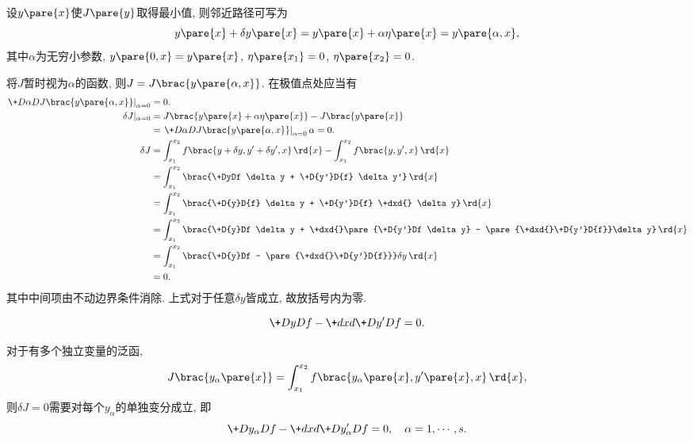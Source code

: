 \documentclass{ctexart}
\begin{document}
设$y\pare{x}$使$J\pare{y}$取得最小值, 则邻近路径可写为
\[ y\pare{x} + \delta y\pare{x} = y\pare{x} + \alpha \eta\pare{x} = y\pare{\alpha, x}, \]
其中$\alpha$为无穷小参数, $y\pare{0,x} = y\pare{x}$, $\eta\pare{x_1} = 0$, $\eta\pare{x_2} = 0$.
\par
将$J$暂时视为$\alpha$的函数, 则$J = J\brac{y\pare{\alpha,x}}$. 在极值点处应当有
\begin{align*}
    \left.\+D{\alpha}D{J\brac{y\pare{\alpha,x}}}\right\vert_{\alpha = 0} &= 0. \\
    \delta J\vert_{\alpha = 0} &= J\brac{y\pare{x} + \alpha \eta\pare{x}} - J\brac{y\pare{x}} \\
    &= \left.\+D{\alpha}D{J\brac{y\pare{\alpha,x}}}\right\vert_{\alpha = 0}\alpha = 0. \\
    \delta J &= \int_{x_1}^{x_2} f\brac{y+\delta y, y'+\delta y', x}\,\rd{x} - \int_{x_1}^{x_2} f\brac{y,y',x}\,\rd{x} \\
    &= \int_{x_1}^{x_2} \brac{\+DyDf \delta y + \+D{y'}D{f} \delta y'}\,\rd{x} \\
    &= \int_{x_1}^{x_2} \brac{\+D{y}D{f} \delta y + \+D{y'}D{f} \+dxd{} \delta y}\,\rd{x} \\
    &= \int_{x_1}^{x_2} \brac{\+D{y}Df \delta y + \+dxd{}\pare{\+D{y'}Df \delta y} - \pare{\+dxd{}\+D{y'}D{f}}\delta y}\,\rd{x} \\
    &= \int_{x_1}^{x_2} \brac{\+D{y}Df  - \pare{\+dxd{}\+D{y'}D{f}}}\delta y\,\rd{x} \\
    &= 0.
\end{align*}
其中中间项由不动边界条件消除. 上式对于任意$\delta y$皆成立, 故放括号内为零.
\begin{theorem}[Euler方程]
    \[ \+D{y}D{f} - \+dxd{}\+D{y'}D{f} = 0. \]
\end{theorem}
对于有多个独立变量的泛函,
\[ J\brac{y_\alpha\pare{x}} = \int_{x_1}^{x_2} f\brac{y_\alpha\pare{x},y'\pare{x},x}\,\rd{x}, \]
则$\delta J = 0$需要对每个$y_\alpha$的单独变分成立, 即
\[ \+D{y_\alpha}D{f} - \+dxd{}\+D{y'_\alpha}D{f} = 0,\quad \alpha = 1,\cdots, s. \]

\end{document}

